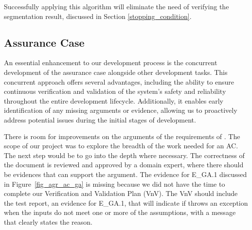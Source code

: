 Successfully applying this algorithm will eliminate the need of verifying the segmentation result, discussed in Section \ref{stopping_condition}.

\subsection{Assurance Case}

An essential enhancement to our development process is the concurrent development of the assurance case alongside other development tasks. This concurrent approach offers several advantages, including the ability to ensure continuous verification and validation of the system's safety and reliability throughout the entire development lifecycle. Additionally, it enables early identification of any missing arguments or evidence, allowing us to proactively address potential issues during the initial stages of development.

There is room for improvements on the arguments of the requirements of \progname{}. The scope of our project was to explore the breadth of the work needed for an AC. The next step would be to go into the depth where necessary. The correctness of the document is reviewed and approved by a domain expert, where there should be evidences that can support the argument. The evidence for  E\_GA.1 discussed in Figure~\ref{fig_agr_ac_ga} is missing because we did not have the time to complete our Verification and Validation Plan (VnV). The VnV should include the test report, an evidence for E\_GA.1, that will indicate if \progname{} throws an exception when the inputs do not meet one or more of the assumptions, with a message that clearly states the reason.